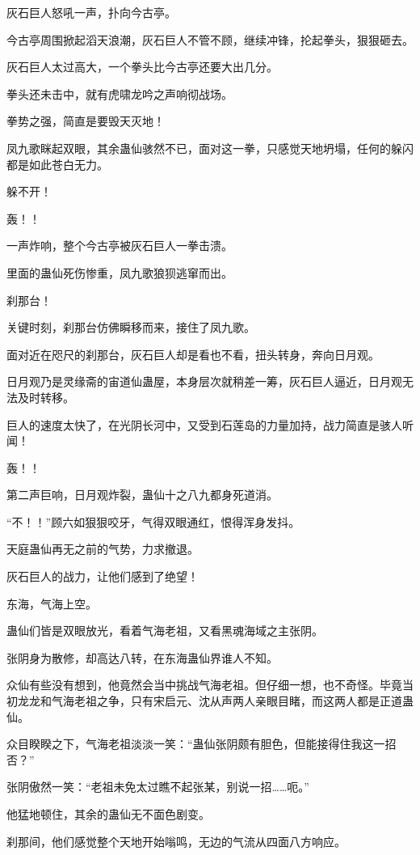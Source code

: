 \begin{this_body}
灰石巨人怒吼一声，扑向今古亭。

今古亭周围掀起滔天浪潮，灰石巨人不管不顾，继续冲锋，抡起拳头，狠狠砸去。

灰石巨人太过高大，一个拳头比今古亭还要大出几分。

拳头还未击中，就有虎啸龙吟之声响彻战场。

拳势之强，简直是要毁天灭地！

凤九歌眯起双眼，其余蛊仙骇然不已，面对这一拳，只感觉天地坍塌，任何的躲闪都是如此苍白无力。

躲不开！

轰！！

一声炸响，整个今古亭被灰石巨人一拳击溃。

里面的蛊仙死伤惨重，凤九歌狼狈逃窜而出。

刹那台！

关键时刻，刹那台仿佛瞬移而来，接住了凤九歌。

面对近在咫尺的刹那台，灰石巨人却是看也不看，扭头转身，奔向日月观。

日月观乃是灵缘斋的宙道仙蛊屋，本身层次就稍差一筹，灰石巨人逼近，日月观无法及时转移。

巨人的速度太快了，在光阴长河中，又受到石莲岛的力量加持，战力简直是骇人听闻！

轰！！

第二声巨响，日月观炸裂，蛊仙十之八九都身死道消。

“不！！”顾六如狠狠咬牙，气得双眼通红，恨得浑身发抖。

天庭蛊仙再无之前的气势，力求撤退。

灰石巨人的战力，让他们感到了绝望！

东海，气海上空。

蛊仙们皆是双眼放光，看着气海老祖，又看黑魂海域之主张阴。

张阴身为散修，却高达八转，在东海蛊仙界谁人不知。

众仙有些没有想到，他竟然会当中挑战气海老祖。但仔细一想，也不奇怪。毕竟当初龙龙和气海老祖之争，只有宋启元、沈从声两人亲眼目睹，而这两人都是正道蛊仙。

众目睽睽之下，气海老祖淡淡一笑：“蛊仙张阴颇有胆色，但能接得住我这一招否？”

张阴傲然一笑：“老祖未免太过瞧不起张某，别说一招……呃。”

他猛地顿住，其余的蛊仙无不面色剧变。

刹那间，他们感觉整个天地开始嗡鸣，无边的气流从四面八方响应。


\end{this_body}
